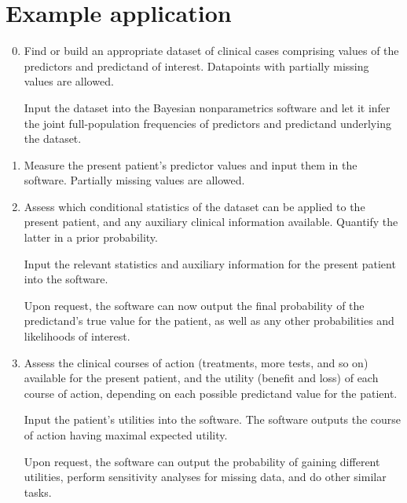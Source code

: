 \documentclass[a4paper,12pt,%
onecolumn,oneside,article,%
british%
]{memoir}
\theoremstyle{remark}
\theoremstyle{innote}
\renewcommand*{\|}[1][]{\nonscript\:#1\vert\nonscript\:\mathopen{}}
\begin{document}
\bigskip%
\section{Example application}
\label{sec:application}

\begin{table}\centering
    \begin{framed}
      \small
      \caption{Main inferential and decision-making steps}\label{tab:main_steps}
      \begin{enumerate}[para,label=(\arabic*),itemsep=1ex,itemindent=3em]
        \setcounter{enumi}{-1}
      \item\label{item:learn} Find or build an appropriate dataset of clinical cases comprising values of the predictors and predictand of interest. Datapoints with partially missing values are allowed.

        Input the dataset into the Bayesian nonparametrics software and let it infer the joint full-population frequencies of predictors and predictand underlying the dataset.

      \item\label{item:predictors} Measure the present patient's predictor values and input them in the software. Partially missing values are allowed.

      \item\label{item:population} Assess which conditional statistics of the dataset can be applied to the present patient, and any auxiliary clinical information available. Quantify the latter in a prior probability.

        Input the relevant statistics and auxiliary information for the present patient into the software. 

        Upon request, the software can now output the final probability of the predictand's true value for the patient, as well as any other probabilities and likelihoods of interest.
        
      \item\label{item:utilities} Assess the clinical courses of action (treatments, more tests, and so on) available for the present patient, and the utility (benefit and loss) of each course of action, depending on each possible predictand value for the patient.

        Input the patient's utilities into the software. The software outputs the course of action having maximal expected utility.

        Upon request, the software can output the probability of gaining different utilities, perform sensitivity analyses for missing data, and do other similar tasks.
      \end{enumerate}
    \end{framed}
\end{table}
\end{document}

